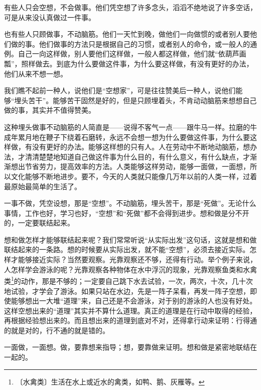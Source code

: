 \documentclass[12pt,UTF-8,openany]{ctexbook}
\begin{document}
\begin{normalsize}
    
    有些人只会空想，不会做事。他们凭空想了许多念头，滔滔不绝地说了许多空话，可是从来没认真做过一件事。
    
    也有些人只顾做事，不动脑筋。他们一天忙到晚，做他们一向做惯的或者别人要他们做的事。他们做事的方法只是根据自己的习惯，或者别人的命令，或一般人的通例。自己一向这样做，别人要他们这样做，一般人都这样做，他们就“依葫芦画瓢”，照样做去。到底为什么要做这件事，为什么要这样做，有没有更好的办法，他们从来不想一想。
    
    我们瞧不起前一种人，说他们是“空想家”，可是往往赞美后一种人，说他们能够“埋头苦干”。能够苦干固然是好的，但是只顾埋着头，不肯动动脑筋来想想自己做的事，其实并不值得赞美。
    
    这种埋头做事不动脑筋的人简直是——说得不客气一点——跟牛马一样。拉磨的牛成年累月地在鞭子下绕着石磨转，永远不会想一想为什么要做这件事，为什么要这样做，有没有更好的办法。能够这样想的只有人。人在劳动中不断地动脑筋，想办法，才清清楚楚地知道自己做这件事为什么目的，有什么意义，有什么缺点，才渐渐想出节省劳力，提高效率的方法。人类能够这样劳动，能够一面做，一面想，所以文化能够不断地进步。要不，今天的人类就只能像几万年以前的人类一样，过着最原始最简单的生活了。
    
    一事不做，凭空设想，那是“空想”。不动脑筋，埋头苦干，那是“死做”。无论什么事情，工作也好，学习也好，“空想”和“死做”都不会得到进步。想和做是分不开的，一定要联结起来。
    
    想和做怎样才能够联结起来呢？我们常常听说“从实际出发”这句话，这就是想和做联结起来的一条路。想的时候要从实际出发，就不能“空想”，必须去接近实际。怎样才能够接近实际？当然要观察。光靠观察还不够，还得有行动。举个例子来说，人怎样学会游泳的呢？光靠观察各种物体在水中浮沉的现象，光靠观察鱼类和水禽类\footnote{〔水禽类〕生活在水上或近水的禽类，如鸭、鹅、灰雁等。}的动作，那是不够的；一定要自己跳下水去试验，一次，两次，十次，几十次地试验，才学会了游泳。如果只站在水边，先是一阵子呆看，再发一阵子空想，即使能够想出一大堆“道理”来，自己还是不会游泳，对于别的游泳的人也没有好处。这样空想出来的“道理”其实并不算什么道理。真正的道理是在行动中取得的经验，再根据经验想出来的。而且想出来的道理到底对不对，还得拿行动来证明：行得通的就是对的，行不通的就是错的。
    
    一面做，一面想。做，要靠想来指导；想，要靠做来证明。想和做是紧密地联结在一起的。
    

\end{normalsize}
\end{document}
